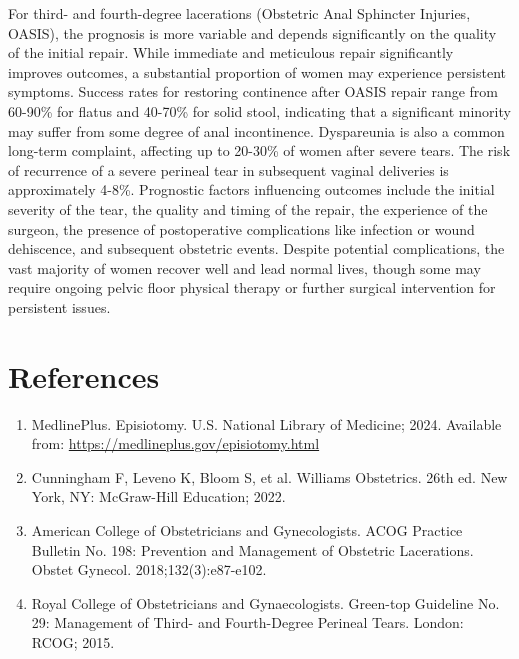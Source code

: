 For third- and fourth-degree lacerations (Obstetric Anal Sphincter Injuries, OASIS), the prognosis is more variable and depends significantly on the quality of the initial repair. While immediate and meticulous repair significantly improves outcomes, a substantial proportion of women may experience persistent symptoms. Success rates for restoring continence after OASIS repair range from 60-90\% for flatus and 40-70\% for solid stool, indicating that a significant minority may suffer from some degree of anal incontinence. Dyspareunia is also a common long-term complaint, affecting up to 20-30\% of women after severe tears. The risk of recurrence of a severe perineal tear in subsequent vaginal deliveries is approximately 4-8\%. Prognostic factors influencing outcomes include the initial severity of the tear, the quality and timing of the repair, the experience of the surgeon, the presence of postoperative complications like infection or wound dehiscence, and subsequent obstetric events. Despite potential complications, the vast majority of women recover well and lead normal lives, though some may require ongoing pelvic floor physical therapy or further surgical intervention for persistent issues.

\section*{References}
\begin{enumerate}
  \item MedlinePlus. Episiotomy. U.S. National Library of Medicine; 2024. Available from: \url{https://medlineplus.gov/episiotomy.html}
  \item Cunningham F, Leveno K, Bloom S, et al. Williams Obstetrics. 26th ed. New York, NY: McGraw-Hill Education; 2022.
  \item American College of Obstetricians and Gynecologists. ACOG Practice Bulletin No. 198: Prevention and Management of Obstetric Lacerations. Obstet Gynecol. 2018;132(3):e87-e102.
  \item Royal College of Obstetricians and Gynaecologists. Green-top Guideline No. 29: Management of Third- and Fourth-Degree Perineal Tears. London: RCOG; 2015.
\end{enumerate}

\clearpage
